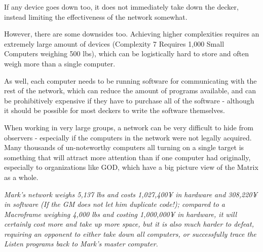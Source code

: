 \begin{multicols}{3}
	If any device goes down too, it does not immediately take down the decker, instead limiting the effectiveness of the network somewhat.
	
	However, there are some downsides too. Achieving higher complexities requires an extremely large amount of devices (Complexity 7 Requires 1,000 Small Computers weighing 500 lbs), which can be logistically hard to store and often weigh more than a single computer. 
	
	As well, each computer needs to be running software for communicating with the rest of the network, which can reduce the amount of programs available, and can be prohibitively expensive if they have to purchase all of the software - although it should be possible for most deckers to write the software themselves. 
	
	When working in very large groups, a network can be very difficult to hide from observers - especially if the computers in the network were not legally acquired. Many thousands of un-noteworthy computers all turning on a single target is something that will attract more attention than if one computer had originally, especially to organizations like GOD, which have a big picture view of the Matrix as a whole.
	
	\textit{\textcolor{OliveGreen}{Mark's network weighs 5,137 lbs and costs 1,027,400¥ in hardware and 308,220¥ in software (If the GM does not let him duplicate code!); compared to a Macroframe weighing 4,000 lbs and costing 1,000,000¥ in hardware, it will certainly cost more and take up more space, but it is also much harder to defeat, requiring an opponent to either take down all computers, or successfully trace the Listen programs back to Mark's master computer.}}
		
	\end{multicols}
